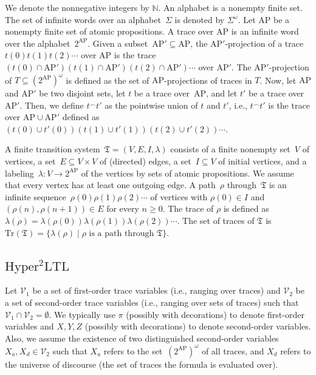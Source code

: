 \documentclass[dvipsnames,10pt,a4paper]{amsart}
\theoremstyle{definition}
\theoremstyle{remark}
\newcommand{\nats}{\mathbb{N}}
\newcommand{\pow}[1]{2^{#1}}
\newcommand{\set}[1]{\{#1\}}
\newcommand{\sohyltl}{\mathrm{Hyper^2LTL}\xspace}
\newcommand{\fovar}{\mathcal{V}_1}
\newcommand{\sovar}{\mathcal{V}_2}
\newcommand{\ap}[0]{\mathrm{AP}}
\newcommand{\univar}{X_a}
\newcommand{\unidisvar}{X_d}
\newcommand{\tsys}{\mathfrak{T}}
\newcommand{\traces}{\mathrm{Tr}}
\newcommand{\merge}{^\smallfrown}
\begin{document}
We denote the nonnegative integers by $\nats$. 
An alphabet is a nonempty finite set. 
The set of infinite words over an alphabet~$\Sigma$ is denoted by $\Sigma^\omega$.
Let $\ap$ be a nonempty finite set of atomic propositions. 
A trace over $\ap$ is an infinite word over the alphabet~$\pow{\ap}$.
Given a subset~$\ap' \subseteq \ap$, the $\ap'$-projection of a trace~$t(0)t(1)t(2) \cdots$ over $\ap$ is the trace~$(t(0) \cap \ap')(t(1) \cap \ap')(t(2) \cap \ap') \cdots$ over $\ap'$.
The $\ap'$-projection of $T \subseteq (\pow{\ap})^\omega$ is defined as the set of $\ap$-projections of traces in $T$.
Now, let $\ap$ and $\ap'$ be two disjoint sets, let $t$ be a trace over~$\ap$, and let $t'$ be a trace over $\ap'$. 
Then, we define $t \merge t'$ as the pointwise union of $t$ and $t'$, i.e., $t \merge t'$ is the trace over $\ap \cup \ap'$ defined as $(t(0) \cup t'(0))(t(1) \cup t'(1))(t(2) \cup t'(2))\cdots$.

A finite transition system~$\tsys = (V,E,I, \lambda)$ consists of a finite nonempty set~$V$ of vertices, a set~$E \subseteq V \times V$ of (directed) edges, a set~$I \subseteq V$ of initial vertices, and a labeling~$\lambda\colon V \rightarrow \pow{\ap}$ of the vertices by sets of atomic propositions.
We assume that every vertex has at least one outgoing edge.
A path~$\rho$ through~$\tsys$ is an infinite sequence~$\rho(0)\rho(1)\rho(2)\cdots$ of vertices with $\rho(0) \in I$ and $(\rho(n),\rho(n+1))\in E$ for every $n \ge 0$.
The trace of $\rho$ is defined as $ \lambda(\rho ) = \lambda(\rho(0))\lambda(\rho(1))\lambda(\rho(2))\cdots$.
The set of traces of $\tsys$ is $\traces(\tsys) = \set{\lambda(\rho) \mid \rho \text{ is a path through $\tsys$}}$.

\subsection{\texorpdfstring{\boldmath$\sohyltl$}{Second-order HyperLTL}}
\label{subsec_hyperltl}
Let $\fovar$ be a set of first-order trace variables (i.e., ranging over traces) and $\sovar$ be a set of second-order trace variables (i.e., ranging over sets of traces) such that $\fovar \cap \sovar = \emptyset$.
We typically use $\pi$ (possibly with decorations) to denote first-order variables and $X, Y, Z$ (possibly with decorations) to denote second-order variables.
Also, we assume the existence of two distinguished second-order variables~$\univar, \unidisvar  \in \sovar$ such that $\univar$ refers to the set~$(\pow{\ap})^\omega$ of all traces, and $\unidisvar$ refers to the universe of discourse (the set of traces the formula is evaluated over).
\end{document}
